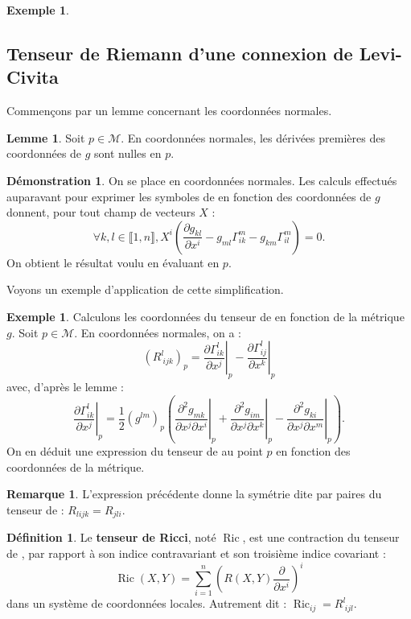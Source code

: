 \documentclass[12pt,a4paper]{article}
\DeclareMathOperator{\Ric}{Ric}
\theoremstyle{definition}
\newtheorem{defn}[thm]{Définition}
\newtheorem{ex}[thm]{Exemple}
\newtheorem{rqe}[thm]{Remarque}
\newtheorem*{dem}{Démonstration}
\newtheorem{lem}[thm]{Lemme}
\begin{document}
\begin{ex}
\subsection{Tenseur de Riemann d'une connexion de Levi-Civita}
Commençons par un lemme concernant les coordonnées normales.
\begin{lem}
Soit $p\in\mathcal{M}$. En coordonnées normales, les dérivées premières des coordonnées de $g$ sont nulles en $p$.
\end{lem}
\begin{dem}
On se place en coordonnées normales. Les calculs effectués auparavant pour exprimer les symboles de  en fonction des coordonnées de $g$ donnent, pour tout champ de vecteurs $X$ :
$$
\forall k,l\in\llbracket 1,n\rrbracket, X^i\left(\dfrac{\partial g_{kl}}{\partial x^i}-g_{ml}\Gamma_{ik}^m-g_{km}\Gamma_{il}^m\right)=0.
$$
On obtient le résultat voulu en évaluant en $p$.
\end{dem}
Voyons un exemple d'application de cette simplification.
\begin{ex}
Calculons les coordonnées du tenseur de  en fonction de la métrique $g$. Soit $p\in\mathcal{M}$. En coordonnées normales, on a :
$$
\left(R_{~ijk}^l\right)_p=\left.\dfrac{\partial\Gamma_{ik}^l}{\partial x^j}\right|_p-\left.\dfrac{\partial\Gamma_{ij}^l}{\partial x^k}\right|_p
$$
avec, d'après le lemme :
$$
\left.\dfrac{\partial\Gamma_{ik}^l}{\partial x^j}\right|_p=\dfrac{1}{2}\left(g^{lm}\right)_p\left(\left.\dfrac{\partial^2 g_{mk}}{\partial x^j\partial x^i}\right|_p+\left.\dfrac{\partial^2 g_{im}}{\partial x^j\partial x^k}\right|_p-\left.\dfrac{\partial^2 g_{ki}}{\partial x^j\partial x^m}\right|_p\right).
$$
On en déduit une expression du tenseur de  au point $p$ en fonction des coordonnées de la métrique.
\end{ex}
\begin{rqe}
L'expression précédente donne la symétrie dite \og par paires \fg{} du tenseur de  : $R_{lijk}=R_{jli}$. 
\end{rqe}
\begin{defn}
Le \textbf{tenseur de Ricci}, noté $\Ric$, est une contraction du tenseur de , par rapport à son indice contravariant et son troisième indice covariant :
$$\displaystyle\Ric(X,Y)=\sum\limits_{i=1}^n\left(R(X,Y)\dfrac{\partial}{\partial x^i}\right)^i$$ dans un système de coordonnées locales. Autrement dit : $\Ric_{ij}=R^l_{~ijl}$.
\end{defn}
\end{ex}
\end{document}
